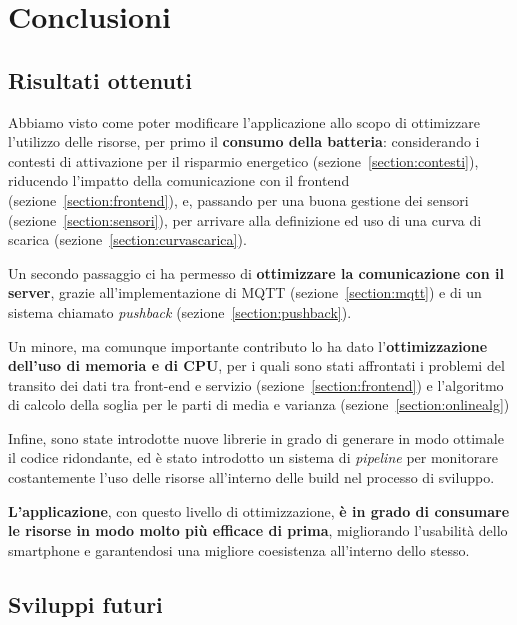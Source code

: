 \documentclass[a4paper,10pt]{memoir}
\begin{document}
\chapter{Conclusioni}

\section{Risultati ottenuti}

Abbiamo visto come poter modificare l'applicazione allo scopo di ottimizzare l'utilizzo delle risorse, per primo il \textbf{consumo della batteria}: considerando i contesti di attivazione per il risparmio energetico (sezione~\ref{section:contesti}), riducendo l'impatto della comunicazione con il frontend (sezione~\ref{section:frontend}), e, passando per una buona gestione dei sensori (sezione~\ref{section:sensori}), per arrivare alla definizione ed uso di una curva di scarica (sezione~\ref{section:curvascarica}).

\medskip

Un secondo passaggio ci ha permesso di \textbf{ottimizzare la comunicazione con il server}, grazie all'implementazione di MQTT (sezione~\ref{section:mqtt}) e di un sistema chiamato \textit{pushback} (sezione~\ref{section:pushback}).

\medskip

Un minore, ma comunque importante contributo lo ha dato l'\textbf{ottimizzazione dell'uso di memoria e di CPU}, per i quali sono stati affrontati i problemi del transito dei dati tra front-end e servizio (sezione~\ref{section:frontend}) e l'algoritmo di calcolo della soglia per le parti di media e varianza (sezione~\ref{section:onlinealg})

\medskip

Infine, sono state introdotte nuove librerie in grado di generare in modo ottimale il codice ridondante, ed è stato introdotto un sistema di \textit{pipeline} per monitorare costantemente l'uso delle risorse all'interno delle build nel processo di sviluppo.

\vspace*{1cm}

\textbf{L'applicazione}, con questo livello di ottimizzazione, \textbf{è in grado di consumare le risorse in modo molto più efficace di prima}, migliorando l'usabilità dello smartphone e garantendosi una migliore coesistenza all'interno dello stesso.

\clearpage

\section{Sviluppi futuri}
\end{document}
